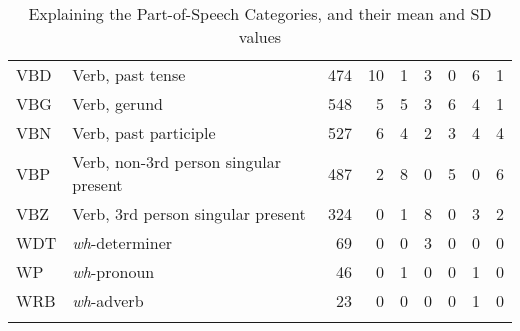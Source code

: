 \begin{table}
\begin{tabularx}{\textwidth}{lQ *{7}{r}}
 VBD & Verb, past tense & 474 & 10 & 1 & 3 & 0 & 6 & 1\\
 VBG & Verb, gerund & 548 & 5 & 5 & 3 & 6 & 4 & 1\\
 VBN & Verb, past participle & 527 & 6 & 4 & 2 & 3 & 4 & 4\\
 VBP & Verb, non-3rd person singular present & 487 & 2 & 8 & 0 & 5 & 0 & 6\\
 VBZ & Verb, 3rd person singular present & 324 & 0 & 1 & 8 & 0 & 3 & 2\\
 WDT & \textit{wh}-determiner & 69 & 0 & 0 & 3 & 0 & 0 & 0\\
 WP & \textit{wh}-pronoun & 46 & 0 & 1 & 0 & 0 & 1 & 0\\
 WRB & \textit{wh}-adverb & 23 & 0 & 0 & 0 & 0 & 1 & 0\\
\lspbottomrule
\end{tabularx}
\caption{Explaining the Part-of-Speech Categories, and their mean and SD values
}
\label{tab:D:1}
\end{table}


